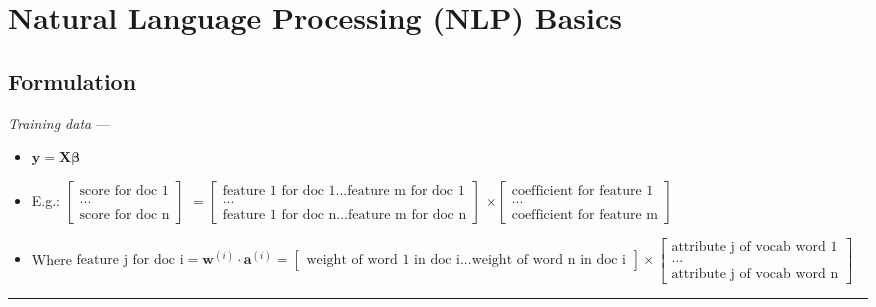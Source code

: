 \section{Natural Language Processing (NLP) Basics}
\subsection*{Formulation}
\emph{Training data}  --- 
\begin{itemize}
    \item $\boldsymbol{y} = \boldsymbol{X} \boldsymbol{\beta}$
    \item E.g.: 
    $\begin{bmatrix}
    \textrm{score for doc 1} \\
    ...\\
    \textrm{score for doc n}
    \end{bmatrix}
    $ 
    $=
    \begin{bmatrix}
    \textrm{feature 1 for doc 1} ... \textrm{feature m for doc 1} \\
    ...\\
    \textrm{feature 1 for doc n} ... \textrm{feature m for doc n}
    \end{bmatrix}
    $
    $
    \times 
    \begin{bmatrix}
    \textrm{coefficient for feature 1} \\
    ...\\
    \textrm{coefficient for feature m}
    \end{bmatrix}
    $
    \item Where $\textrm{feature j for doc i} = \boldsymbol{w}^{(i)} \cdot \boldsymbol{a}^{(i)} = 
    \begin{bmatrix}
    \textrm{weight of word 1 in doc i...weight of word n in doc i}
    \end{bmatrix}
    \times 
    \begin{bmatrix}
    \textrm{attribute j of vocab word 1} \\
    ...\\
    \textrm{attribute j of vocab word n}
    \end{bmatrix}
    $
\end{itemize}

{\color{lightgray}\hrule height 0.001mm}

